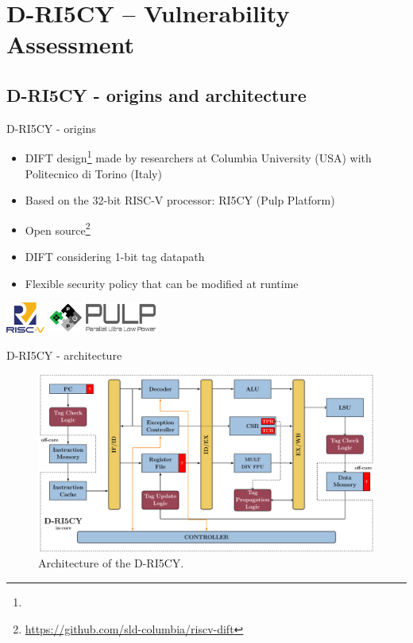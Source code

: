 \section{D-RI5CY -- Vulnerability Assessment}

\subsection{D-RI5CY - origins and architecture}
\begin{frame}{D-RI5CY - origins}
    \begin{itemize}
        \item DIFT design\footnote[frame]{\tiny{}} made by researchers at Columbia University (USA) with Politecnico di Torino (Italy)
        \item Based on the 32-bit RISC-V processor: RI5CY (Pulp Platform)
        \item Open source\footnote{\tiny\url{https://github.com/sld-columbia/riscv-dift}}
        \item DIFT considering 1-bit tag datapath
        \item Flexible security policy that can be modified at runtime
    \end{itemize}

    \centering
    \vfill
    \includegraphics[height=1cm]{img/logo/riscv.png}
    \hspace{1cm}
    \includegraphics[height=1cm]{img/logo/pulp_logo.pdf}
    \vfill
\end{frame}
\begin{frame}{D-RI5CY - architecture}
    \begin{figure}
        \centering
        \includegraphics[width=.9\textwidth]{src/2_vuln_assessment/img/RI5CY.pdf}
        \caption{Architecture of the D-RI5CY.}
        \label{fig:riscy}
    \end{figure}
\end{frame}
